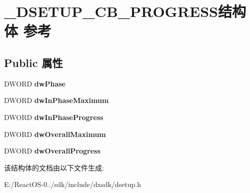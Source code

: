 \hypertarget{struct___d_s_e_t_u_p___c_b___p_r_o_g_r_e_s_s}{}\section{\+\_\+\+D\+S\+E\+T\+U\+P\+\_\+\+C\+B\+\_\+\+P\+R\+O\+G\+R\+E\+S\+S结构体 参考}
\label{struct___d_s_e_t_u_p___c_b___p_r_o_g_r_e_s_s}
\subsection*{Public 属性}
\begin{DoxyCompactItemize}
\item 
\mbox{\label{struct___d_s_e_t_u_p___c_b___p_r_o_g_r_e_s_s_a0965b304cb5672cc8c818826fb4d4326}} 
D\+W\+O\+RD {\bfseries dw\+Phase}
\item 
\mbox{\label{struct___d_s_e_t_u_p___c_b___p_r_o_g_r_e_s_s_a4194c1d648963b6a3467d4d30ec52ba0}} 
D\+W\+O\+RD {\bfseries dw\+In\+Phase\+Maximum}
\item 
\mbox{\label{struct___d_s_e_t_u_p___c_b___p_r_o_g_r_e_s_s_abd9a82bcea3b9b4c5a774ad0792e5ab0}} 
D\+W\+O\+RD {\bfseries dw\+In\+Phase\+Progress}
\item 
\mbox{\label{struct___d_s_e_t_u_p___c_b___p_r_o_g_r_e_s_s_a38e94d933bc206264011014b0c52a661}} 
D\+W\+O\+RD {\bfseries dw\+Overall\+Maximum}
\item 
\mbox{\label{struct___d_s_e_t_u_p___c_b___p_r_o_g_r_e_s_s_a37f475184b40e9fc696a1164ce24b295}} 
D\+W\+O\+RD {\bfseries dw\+Overall\+Progress}
\end{DoxyCompactItemize}


该结构体的文档由以下文件生成\+:\begin{DoxyCompactItemize}
\item 
E\+:/\+React\+O\+S-\/0../sdk/include/dxsdk/dsetup.\+h\end{DoxyCompactItemize}
